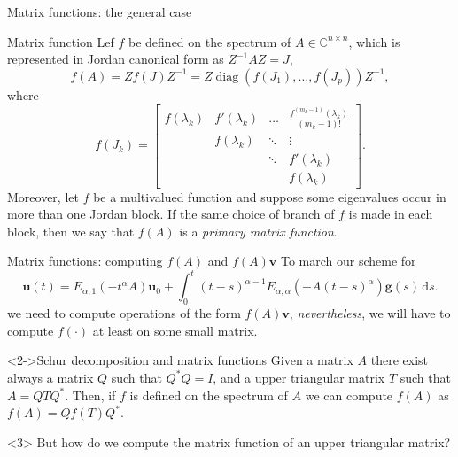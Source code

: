 \documentclass[aspectratio=169,xcolor=dvipsnames]{beamer}
\begin{document}
\begin{frame}{Matrix functions: the general case}
\begin{block}{Matrix function}
	Lef $f$ be defined on the spectrum of $A \in \mathbb{C}^{n \times
		n}$, which is represented in Jordan canonical form as $Z^{-1}AZ = J$,\vspace{-0.5em}
	\begin{equation*}
	f(A) = Z f(J) Z^{-1} = Z \operatorname{diag}(f(J_1),\ldots,f(J_p))Z^{-1},
	\end{equation*}
	where\vspace{-0.5em}
	\begin{equation*}
	f(J_k) = \begin{bmatrix}
	f(\lambda_k) & f'(\lambda_k) & \ldots & \frac{f^{(m_k-1)}(\lambda_k)}{(m_k-1)!} \\
	& f(\lambda_k) & \ddots & \vdots \\
	& & \ddots & f'(\lambda_k) \\
	& & & f(\lambda_k)
	\end{bmatrix}.
	\end{equation*}
	Moreover, let $f$ be a multivalued function and suppose some eigenvalues occur in more than one Jordan block. If the same choice of branch of $f$ is made in each block, then we say that $f(A)$ is a \textit{primary matrix function}.
\end{block}
\end{frame}

\begin{frame}{Matrix functions: computing $f(A)$ and $f(A)\mathbf{v}$}
To march our scheme for
\[
\mathbf{u}(t) = E_{\alpha,1}(-t^\alpha A) \mathbf{u}_0 + \int_{0}^{t} (t-s)^{\alpha-1} E_{\alpha,\alpha}(-A(t-s)^\alpha)\mathbf{g}(s)\,\textrm{d}s.
\]
we need to compute operations of the form $f(A)\mathbf{v}$, \emph{nevertheless}, we will have to compute $f(\cdot)$ at least on some \alert{small matrix}.

\begin{block}<2->{Schur decomposition and matrix functions}
Given a matrix $A$ there exist always a matrix $Q$ such that $Q^*Q = I$, and a upper triangular matrix $T$ such that $A = Q T Q^*$. Then, if $f$ is \alert{defined on the spectrum} of $A$ we can compute $f(A)$ as $f(A) = Q f(T) Q^*$.
\end{block}

\begin{onslide}<3>
But how do we compute the matrix function of an upper triangular matrix?
\end{onslide}

\end{frame}
\end{document}
